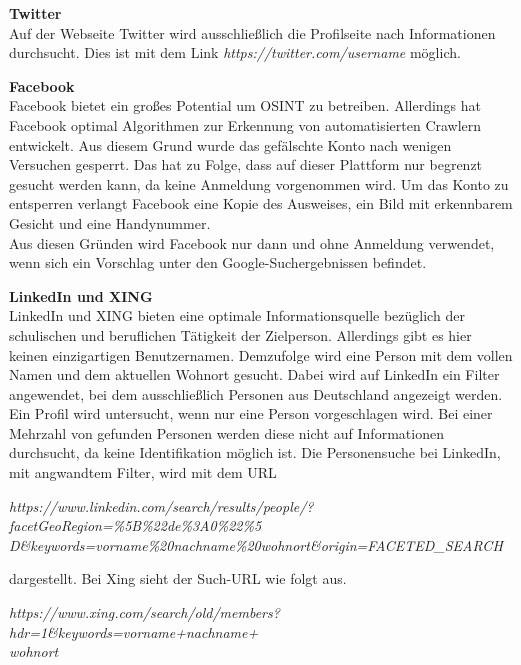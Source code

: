 			\textbf{Twitter}\\
			Auf der Webseite Twitter wird ausschließlich die Profilseite nach Informationen durchsucht. Dies ist mit dem Link \textit{https://twitter.com/username} möglich.
			
			\textbf{Facebook}\\
			Facebook bietet ein großes Potential um OSINT zu betreiben. Allerdings hat Facebook optimal Algorithmen zur Erkennung von automatisierten Crawlern entwickelt. Aus diesem Grund wurde das gefälschte Konto nach wenigen Versuchen gesperrt. Das hat zu Folge, dass auf dieser Plattform nur begrenzt gesucht werden kann, da keine Anmeldung vorgenommen wird. Um das Konto zu entsperren verlangt Facebook eine Kopie des Ausweises, ein Bild mit erkennbarem Gesicht und eine Handynummer.\\
			Aus diesen Gründen wird Facebook nur dann und ohne Anmeldung verwendet, wenn sich ein Vorschlag unter den Google-Suchergebnissen befindet.

			\textbf{LinkedIn und XING}\\
			LinkedIn und XING bieten eine optimale Informationsquelle bezüglich der schulischen und beruflichen Tätigkeit der Zielperson. Allerdings gibt es hier keinen einzigartigen Benutzernamen. Demzufolge wird eine Person mit dem vollen Namen und dem aktuellen Wohnort gesucht. Dabei wird auf LinkedIn ein Filter angewendet, bei dem ausschließlich Personen aus Deutschland angezeigt werden. Ein Profil wird untersucht, wenn nur eine Person vorgeschlagen wird. Bei einer Mehrzahl von gefunden Personen werden diese nicht auf Informationen durchsucht, da keine Identifikation möglich ist.
			Die Personensuche bei LinkedIn, mit angwandtem Filter, wird mit dem URL
			
			\textit{https://www.linkedin.com/search/results/people/?facetGeoRegion=\%5B\%22de\%3A0\%22\%5\\D\&keywords=vorname\%20nachname\%20wohnort\&origin=FACETED\_SEARCH} 
			
			dargestellt. Bei Xing sieht der Such-URL wie folgt aus.
						
			\textit{https://www.xing.com/search/old/members?hdr=1\&keywords=vorname+nachname+\\wohnort}
			
			
